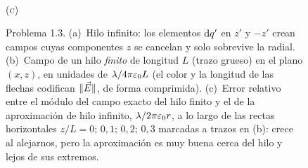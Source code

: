 \begin{figure}[ht]
\\[2pt]{\small\scshape (c)}
\caption{Problema 1.3. (a)~Hilo infinito: los elementos $\mathrm{d} q'$ en $z'$ y $-z'$ crean campos cuyas componentes $z$ se cancelan y
solo sobrevive la radial. (b)~Campo de un hilo \emph{finito} de longitud $L$ (trazo grueso) en el plano $(x,z)$, en unidades
de $\lambda/4\pi\varepsilon_{0} L$ (el color y la longitud de las flechas codifican $\lVert \vec{E}\rVert$, de forma comprimida). (c)~Error relativo
entre el módulo del campo exacto del hilo finito y el de la aproximación de hilo infinito, $\lambda/2\pi\varepsilon_{0} r$, a lo largo de las rectas horizontales
$z/L=0;\,0{,}1;\,0{,}2;\,0{,}3$ marcadas a trazos en (b): crece al alejarnos, pero la aproximación es muy buena cerca del hilo y lejos de sus extremos.}
\label{fig:sem-hilo}
\end{figure}
